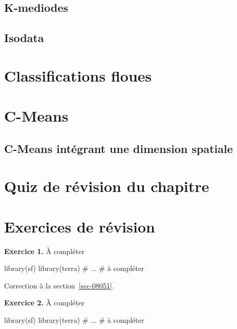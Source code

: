 \documentclass[
  letterpaper,
  DIV=11,
  numbers=noendperiod]{scrreprt}
\newenvironment{Shaded}{\begin{snugshade}}{\end{snugshade}}
\newcommand{\CommentTok}[1]{\textcolor[rgb]{0.37,0.37,0.37}{#1}}
\newcommand{\NormalTok}[1]{\textcolor[rgb]{0.00,0.23,0.31}{#1}}
\begin{document}
\subsection{K-mediodes}\label{sec-0612}

\subsection{Isodata}\label{sec-0613}

\section{Classifications floues}\label{sec-062}

\section{C-Means}\label{sec-0621}

\subsection{C-Means intégrant une dimension spatiale}\label{sec-0622}

\section{Quiz de révision du chapitre}\label{sec-063}

\section{Exercices de révision}\label{sec-064}

\textbf{Exercice 1.} À compléter

\begin{Shaded}
\begin{Highlighting}[]
\NormalTok{library(sf)}
\NormalTok{library(terra)}
\CommentTok{\# ...}
\CommentTok{\# à compléter}
\end{Highlighting}
\end{Shaded}

Correction à la section~\ref{sec-08051}.

\textbf{Exercice 2.} À compléter

\begin{Shaded}
\begin{Highlighting}[]
\NormalTok{library(sf)}
\NormalTok{library(terra)}
\CommentTok{\# ...}
\CommentTok{\# à compléter}
\end{Highlighting}
\end{Shaded}
\end{document}
